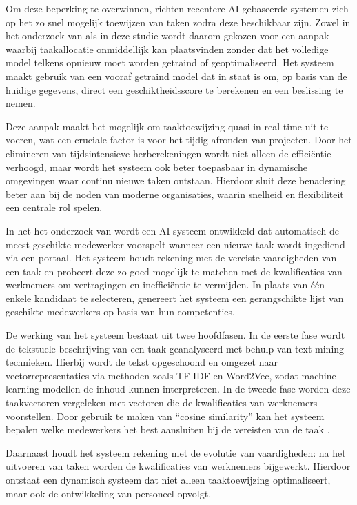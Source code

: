\vspace{1em}Om deze beperking te overwinnen, richten recentere AI-gebaseerde systemen zich op het zo snel mogelijk toewijzen van taken zodra deze beschikbaar zijn. Zowel in het onderzoek van \textcite{Arslan_2024} als in deze studie wordt daarom gekozen voor een aanpak waarbij taakallocatie onmiddellijk kan plaatsvinden zonder dat het volledige model telkens opnieuw moet worden getraind of geoptimaliseerd. Het systeem maakt gebruik van een vooraf getraind model dat in staat is om, op basis van de huidige gegevens, direct een geschiktheidsscore te berekenen en een beslissing te nemen.

Deze aanpak maakt het mogelijk om taaktoewijzing quasi in real-time uit te voeren, wat een cruciale factor is voor het tijdig afronden van projecten. Door het elimineren van tijdsintensieve herberekeningen wordt niet alleen de efficiëntie verhoogd, maar wordt het systeem ook beter toepasbaar in dynamische omgevingen waar continu nieuwe taken ontstaan. Hierdoor sluit deze benadering beter aan bij de noden van moderne organisaties, waarin snelheid en flexibiliteit een centrale rol spelen.

\vspace{1em}In het het onderzoek van \textcite{Arslan_2024} wordt een AI-systeem ontwikkeld dat automatisch de meest geschikte medewerker voorspelt wanneer een nieuwe taak wordt ingediend via een portaal. Het systeem houdt rekening met de vereiste vaardigheden van een taak en probeert deze zo goed mogelijk te matchen met de kwalificaties van werknemers om vertragingen en inefficiëntie te vermijden. In plaats van één enkele kandidaat te selecteren, genereert het systeem een gerangschikte lijst van geschikte medewerkers op basis van hun competenties.

De werking van het systeem bestaat uit twee hoofdfasen. In de eerste fase wordt de tekstuele beschrijving van een taak geanalyseerd met behulp van text mining-technieken. Hierbij wordt de tekst opgeschoond en omgezet naar vectorrepresentaties via methoden zoals TF-IDF en Word2Vec, zodat machine learning-modellen de inhoud kunnen interpreteren. In de tweede fase worden deze taakvectoren vergeleken met vectoren die de kwalificaties van werknemers voorstellen. Door gebruik te maken van ``cosine similarity'' kan het systeem bepalen welke medewerkers het best aansluiten bij de vereisten van de taak \autocite{Arslan_2024}.

Daarnaast houdt het systeem rekening met de evolutie van vaardigheden: na het uitvoeren van taken worden de kwalificaties van werknemers bijgewerkt. Hierdoor ontstaat een dynamisch systeem dat niet alleen taaktoewijzing optimaliseert, maar ook de ontwikkeling van personeel opvolgt.


